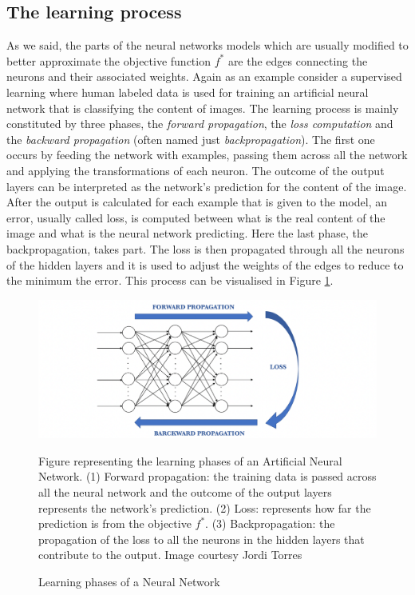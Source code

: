 \subsection{The learning process}

As we said, the parts of the neural networks models which are usually modified to better approximate the objective function \(f^*\) are the edges connecting the neurons and their associated weights. Again as an example consider a supervised learning where human labeled data is used for training an artificial neural network that is classifying the content of images. The learning process is mainly constituted by three phases, the \textit{forward propagation}, the \textit{loss computation} and the \textit{backward propagation} (often named just \textit{backpropagation}). The first one occurs by feeding the network with examples, passing them across all the network and applying the transformations of each neuron. The outcome of the output layers can be interpreted as the network's prediction for the content of the image. After the output is calculated for each example that is given to the model, an error, usually called loss, is computed between what is the real content of the image and what is the neural network predicting. Here the last phase, the backpropagation, takes part. The loss is then propagated through all the neurons of the hidden layers and it is used to adjust the weights of the edges to reduce to the minimum the error. This process can be visualised in Figure  \ref{fig:backward_forward_propagation}.
\begin{figure}
\centering
\includegraphics[width=15cm]{pictures/forward_backward_propagation.png}
\caption{Learning phases of a Neural Network}
Figure representing the learning phases of an Artificial Neural Network. (1) Forward propagation: the training data is passed across all the neural network and the outcome of the output layers represents the network's prediction. (2) Loss: represents how far the prediction is from the objective \(f^*\). (3) Backpropagation: the propagation of the loss to all the neurons in the hidden layers that contribute to the output. Image courtesy Jordi Torres \cite{backward_forward_propagation}
\label{fig:backward_forward_propagation}
\end{figure}
